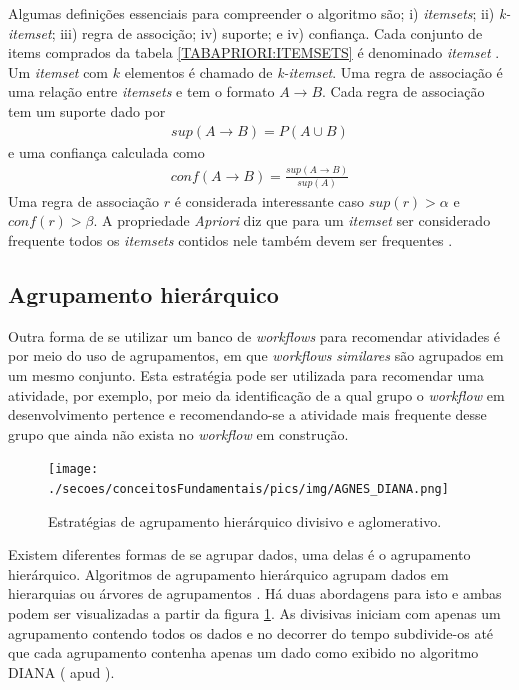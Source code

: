 Algumas definições essenciais para compreender o algoritmo são; i) \emph{itemsets}; ii) \emph{k-itemset}; iii) regra de associção; iv) suporte; e iv) confiança. Cada conjunto de items comprados da tabela \ref{TABAPRIORI:ITEMSETS} é denominado \emph{itemset} \cite{HanKamber2011}. Um \emph{itemset} com \(k\) elementos é chamado de \emph{k-itemset}. Uma regra de associação é uma relação entre \emph{itemsets} e tem o formato \(A \rightarrow B\). Cada regra de associação tem um suporte dado por
\begin{align}
sup(A \rightarrow B) =  P(A \cup B)
\end{align}
e uma confiança calculada como
\begin{align}
conf(A \rightarrow B) =  \frac{sup(A \rightarrow B)}{sup(A)}
\end{align}
Uma regra de associação \(r\) é considerada interessante caso \(sup(r) > \alpha\) e \(conf(r) > \beta\). A propriedade \emph{Apriori} diz que para um \emph{itemset} ser considerado frequente todos os \emph{itemsets} contidos nele também devem ser frequentes \cite{HanKamber2011}. 

\subsection{Agrupamento hierárquico}\label{HHIERARQUICO}
Outra forma de se utilizar um banco de \emph{workflows} para recomendar atividades é por meio do uso de agrupamentos, em que \emph{workflows} \emph{similares} são agrupados em um mesmo conjunto. Esta estratégia pode ser utilizada para recomendar uma atividade, por exemplo, por meio da identificação de a qual grupo o \emph{workflow} em desenvolvimento pertence e recomendando-se a atividade mais frequente desse grupo que ainda não exista no \emph{workflow} em construção.
\begin{figure}[!hbt]
    \centering  
    \caption{Estratégias de agrupamento hierárquico divisivo e aglomerativo.}
    \texttt{[image: ./secoes/conceitosFundamentais/pics/img/AGNES\_DIANA.png]}
	\label{figura_exemplo_clusters}
\end{figure}

Existem diferentes formas de se agrupar dados, uma delas é o agrupamento hierárquico. Algoritmos de agrupamento hierárquico agrupam dados em hierarquias ou árvores de agrupamentos \cite{HanKamber2011}. Há duas abordagens para isto e ambas podem ser visualizadas a partir da figura \ref{figura_exemplo_clusters}. As divisivas iniciam com apenas um agrupamento contendo todos os dados e no decorrer do tempo subdivide-os até que cada agrupamento contenha apenas um dado como exibido no algoritmo DIANA ( apud ).

